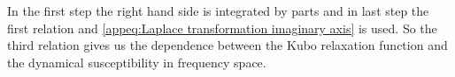 %
In the first step the right hand side is integrated by parts and in last step the first relation and \eqref{appeq:Laplace transformation imaginary axis} is used.
So the third relation gives us the dependence between the Kubo relaxation function and the dynamical susceptibility in frequency space. 